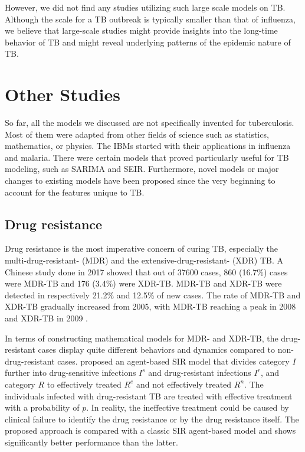 \documentclass[8pt,twocolumn]{extarticle}
\begin{document}
However, we did not find any studies utilizing such large scale models on TB. Although the scale for a TB outbreak is typically smaller than that of influenza, we believe that large-scale studies might provide insights into the long-time behavior of TB and might reveal underlying patterns of the epidemic nature of TB.

\section{Other Studies}
So far, all the models we discussed are not specifically invented for tuberculosis. Most of them were adapted from other fields of science such as statistics, mathematics, or physics. The IBMs started with their applications in influenza and malaria. There were certain models that proved particularly useful for TB modeling, such as SARIMA and SEIR. Furthermore, novel models or major changes to existing models have been proposed since the very beginning to account for the features unique to TB.

\subsection{Drug resistance}
Drug resistance is the most imperative concern of curing TB, especially the multi-drug-resistant- (MDR) and the extensive-drug-resistant- (XDR) TB. A Chinese study done in 2017 showed that out of 37600 cases, 860 (16.7\%) cases were MDR-TB and 176 (3.4\%) were XDR-TB. MDR-TB and XDR-TB were detected in respectively 21.2\% and 12.5\% of new cases. The rate of MDR-TB and XDR-TB gradually increased from 2005, with MDR-TB reaching a peak in 2008 and XDR-TB in 2009 \cite{China2017}.

In terms of constructing mathematical models for MDR- and XDR-TB, the drug-resistant cases display quite different behaviors and dynamics compared to non-drug-resistant cases. \cite{DR1} proposed an agent-based SIR model that divides category $I$ further into drug-sensitive infections $I^s$ and drug-resistant infections $I^r$, and category $R$ to effectively treated $R^e$ and not effectively treated $R^n$. The individuals infected with drug-resistant TB are treated with effective treatment with a probability of $p$. In reality, the ineffective treatment could be caused by clinical failure to identify the drug resistance or by the drug resistance itself. The proposed approach is compared with a classic SIR agent-based model and shows significantly better performance than the latter.
\end{document}
